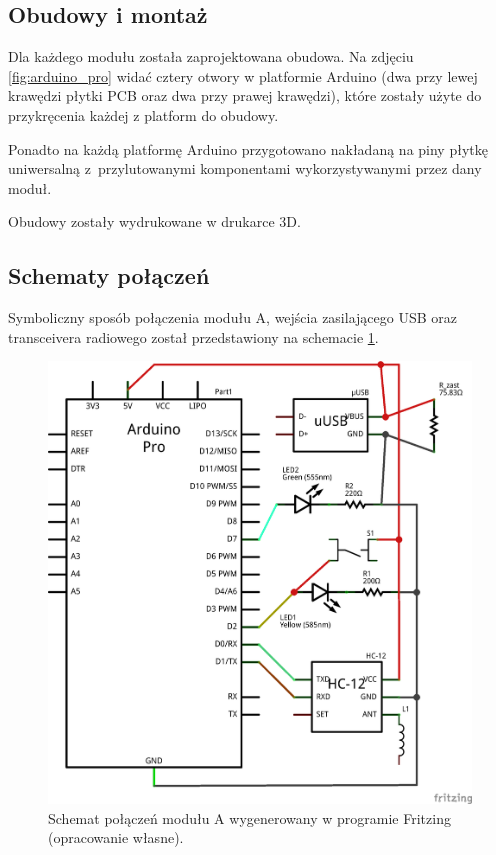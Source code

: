 \subsection{Obudowy i montaż}
\label{subsec:obudowy_montaz}

Dla każdego modułu została zaprojektowana obudowa. Na zdjęciu \ref{fig:arduino_pro} widać cztery otwory w platformie Arduino (dwa przy lewej krawędzi płytki PCB oraz dwa przy prawej krawędzi), które zostały użyte do przykręcenia każdej z platform do obudowy.

Ponadto na każdą platformę Arduino przygotowano nakładaną na piny płytkę uniwersalną z~przylutowanymi komponentami wykorzystywanymi przez dany moduł.  %

Obudowy zostały wydrukowane w drukarce 3D.  %

\subsection{Schematy połączeń}
\label{subsec:schematy_polaczen}

Symboliczny sposób połączenia modułu A, wejścia zasilającego USB oraz transceivera radiowego został przedstawiony na schemacie \ref{fig:symbolic_schema_A}.

\begin{figure}[H]
	\centering
	\includegraphics[scale=0.4]{schemas/schema_moduleA_schem.png}
	\caption{\label{fig:symbolic_schema_A}Schemat połączeń modułu A wygenerowany w programie Fritzing \cite{Fritzing} (opracowanie własne).}
\end{figure}

